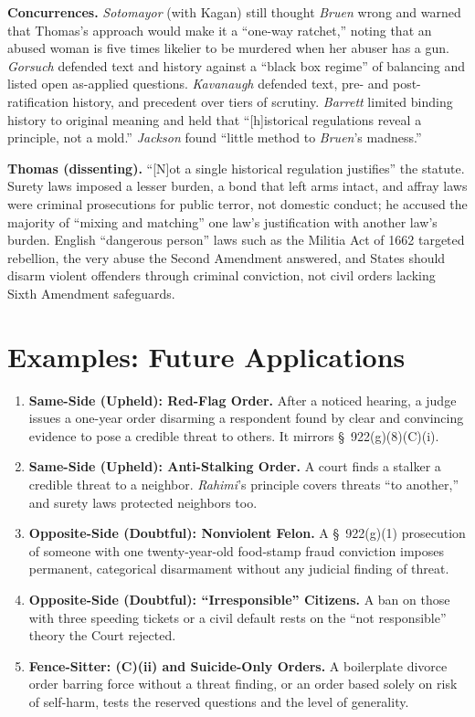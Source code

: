 \documentclass[12pt]{article}
\begin{document}
\textbf{Concurrences.} \textit{Sotomayor} (with Kagan) still thought \textit{Bruen} wrong and warned that Thomas's approach would make it a ``one-way ratchet,'' noting that an abused woman is five times likelier to be murdered when her abuser has a gun. \textit{Gorsuch} defended text and history against a ``black box regime'' of balancing and listed open as-applied questions. \textit{Kavanaugh} defended text, pre- and post-ratification history, and precedent over tiers of scrutiny. \textit{Barrett} limited binding history to original meaning and held that ``[h]istorical regulations reveal a principle, not a mold.'' \textit{Jackson} found ``little method to \textit{Bruen}'s madness.''

\textbf{Thomas (dissenting).} ``[N]ot a single historical regulation justifies'' the statute. Surety laws imposed a lesser burden, a bond that left arms intact, and affray laws were criminal prosecutions for public terror, not domestic conduct; he accused the majority of ``mixing and matching'' one law's justification with another law's burden. English ``dangerous person'' laws such as the Militia Act of 1662 targeted rebellion, the very abuse the Second Amendment answered, and States should disarm violent offenders through criminal conviction, not civil orders lacking Sixth Amendment safeguards.

\section{Examples: Future Applications}

\begin{enumerate}
\item \textbf{Same-Side (Upheld): Red-Flag Order.} After a noticed hearing, a judge issues a one-year order disarming a respondent found by clear and convincing evidence to pose a credible threat to others. It mirrors \S\ 922(g)(8)(C)(i).
\item \textbf{Same-Side (Upheld): Anti-Stalking Order.} A court finds a stalker a credible threat to a neighbor. \textit{Rahimi}'s principle covers threats ``to another,'' and surety laws protected neighbors too.
\item \textbf{Opposite-Side (Doubtful): Nonviolent Felon.} A \S\ 922(g)(1) prosecution of someone with one twenty-year-old food-stamp fraud conviction imposes permanent, categorical disarmament without any judicial finding of threat.
\item \textbf{Opposite-Side (Doubtful): ``Irresponsible'' Citizens.} A ban on those with three speeding tickets or a civil default rests on the ``not responsible'' theory the Court rejected.
\item \textbf{Fence-Sitter: (C)(ii) and Suicide-Only Orders.} A boilerplate divorce order barring force without a threat finding, or an order based solely on risk of self-harm, tests the reserved questions and the level of generality.
\end{enumerate}
\end{document}
